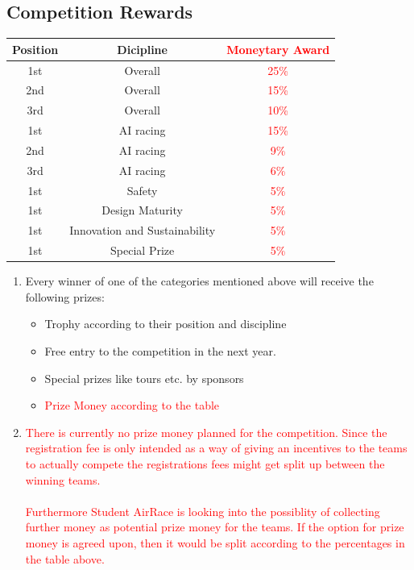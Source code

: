     \subsection{Competition Rewards}
    \begin{center}
        \begin{tabular}{|c|c|c|} 
          \hline
          Position & Dicipline & \textcolor{red}{Moneytary Award} \\
          \hline
          1st & Overall & \textcolor{red}{25\%} \\ 
          \hline
          2nd  & Overall & \textcolor{red}{15\%} \\ 
          \hline
          3rd & Overall & \textcolor{red}{10\%} \\ 
          \hline
          1st & AI racing & \textcolor{red}{15\%} \\ 
          \hline
          2nd  & AI racing & \textcolor{red}{9\%} \\ 
          \hline
          3rd & AI racing & \textcolor{red}{6\%} \\ 
          \hline
          1st & Safety & \textcolor{red}{5\%} \\ 
          \hline
          1st & Design Maturity & \textcolor{red}{5\%} \\ 
          \hline
          1st & Innovation and Sustainability & \textcolor{red}{5\%} \\ 
          \hline
          1st & Special Prize & \textcolor{red}{5\%} \\ 
          \hline
        \end{tabular}
      \end{center}
      

    \begin{enumerate}
      \item Every winner of one of the categories mentioned above will receive the following prizes:
      
      \begin{itemize}
        \item Trophy according to their position and discipline
        \item Free entry to the competition in the next year.
        \item Special prizes like tours etc. by sponsors
        \item \textcolor{red}{Prize Money according to the table}
      \end{itemize}

      \item \textcolor{red}{There is currently no prize money planned for the competition. Since the registration fee is only intended as a way of giving an incentives to the teams to actually compete the registrations fees might get split up between the winning teams. \\ \\ Furthermore Student AirRace is looking into 
      the possiblity of collecting further money as potential prize money for the teams. If the option for prize money is agreed upon, then it would be split according to the percentages in the table above. }
    \end{enumerate}

